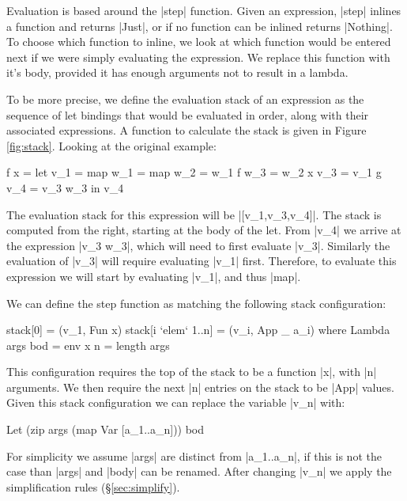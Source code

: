 \documentclass{sigplanconf}
\begin{document}
Evaluation is based around the |step| function. Given an expression, |step| inlines a function and returns |Just|, or if no function can be inlined returns |Nothing|. To choose which function to inline, we look at which function would be entered next if we were simply evaluating the expression. We replace this function with it's body, provided it has enough arguments not to result in a lambda.

To be more precise, we define the evaluation stack of an expression as the sequence of let bindings that would be evaluated in order, along with their associated expressions. A function to calculate the stack is given in Figure \ref{fig:stack}. Looking at the original example:

\begin{code}
\g f x =  let  v_1 = map
               w_1 = map
               w_2 = w_1 f
               w_3 = w_2 x
               v_3 = v_1 g
               v_4 = v_3 w_3
          in   v_4
\end{code}

The evaluation stack for this expression will be |[v_1,v_3,v_4]|. The stack is computed from the right, starting at the body of the let. From |v_4|  we arrive at the expression |v_3 w_3|, which will need to first evaluate |v_3|. Similarly the evaluation of |v_3| will require evaluating |v_1| first. Therefore, to evaluate this expression we will start by evaluating |v_1|, and thus |map|.

We can define the step function as matching the following stack configuration:

\begin{code}
stack[0]              = (v_1, Fun x)
stack[i `elem` 1..n]  = (v_i, App _ a_i)
    where  Lambda args bod = env x
           n = length args
\end{code}

This configuration requires the top of the stack to be a function |x|, with |n| arguments. We then require the next |n| entries on the stack to be |App| values. Given this stack configuration we can replace the variable |v_n| with:

\begin{code}
Let (zip args (map Var [a_1..a_n])) bod
\end{code}

For simplicity we assume |args| are distinct from |a_1..a_n|, if this is not the case than |args| and |body| can be renamed. After changing |v_n| we apply the simplification rules (\S\ref{sec:simplify}).
\end{document}
